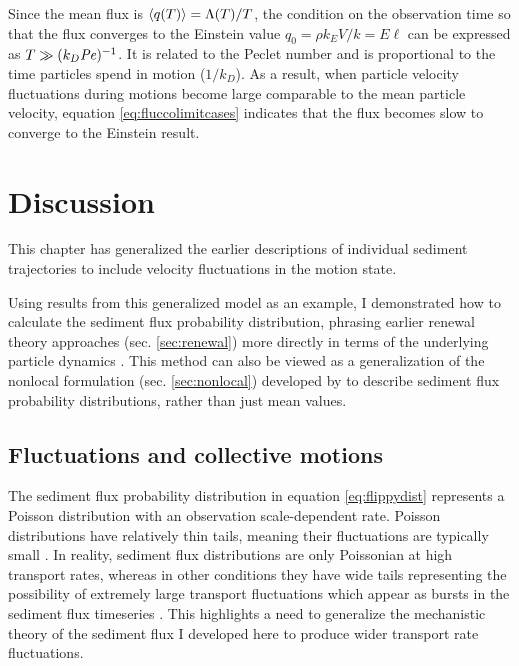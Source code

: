 Since the mean flux is $\langle q(T) \rangle = \Lambda(T)/T$, the condition on the observation time so that the flux converges to the Einstein value $q_0 = \rho k_E V/k = E \ell$ can be expressed as $T\gg (k_D \mbox{\textit{Pe}})^{-1}$. It is related to the Peclet number and is proportional to the time particles spend in motion ($1/k_D$). As a result, when particle velocity fluctuations during motions become large comparable to the mean particle velocity, equation \ref{eq:fluccolimitcases} indicates that the flux becomes slow to converge to the Einstein result.

\section{Discussion \label{sec:disc}}

This chapter has generalized the earlier descriptions of individual sediment trajectories \citep[e.g.][]{Lisle1998,Lajeunesse2017} to include velocity fluctuations in the motion state.

Using results from this generalized model as an example, I demonstrated how to calculate the sediment flux probability distribution, phrasing earlier renewal theory approaches (sec. \ref{sec:renewal}) more directly in terms of the underlying particle dynamics \citep[e.g.][]{Turowski2010,Ancey2020}.
This method can also be viewed as a generalization of the nonlocal formulation (sec. \ref{sec:nonlocal}) developed by \citet{Parker2000,Furbish2012a} to describe sediment flux probability distributions, rather than just mean values.

\subsection{Fluctuations and collective motions}

The sediment flux probability distribution in equation \ref{eq:flippydist} represents a Poisson distribution with an observation scale-dependent rate.
Poisson distributions have relatively thin tails, meaning their fluctuations are typically small \citep{Ancey2006}.
In reality, sediment flux distributions are only Poissonian at high transport rates, whereas in other conditions they have wide tails representing the possibility of extremely large transport fluctuations \citep{Ancey2008,Turowski2010,Dhont2018,Saletti2015} which appear as bursts \citep[e.g.][]{Goh2008} in the sediment flux timeseries \citep{Singh2009, Heyman2013,Benavides2021}. 
This highlights a need to generalize the mechanistic theory of the sediment flux I developed here to produce wider transport rate fluctuations.

